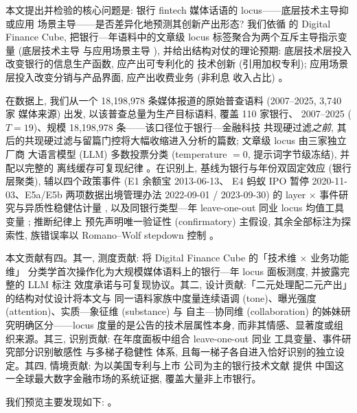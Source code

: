本文提出并检验的核心问题是: 银行 fintech 媒体话语的 locus——底层技术主导抑或应用
场景主导——是否差异化地预测其创新产出形态? 我们依循 \textcite{gomber2017cube} 的
Digital Finance Cube, 把银行—年语料中的文章级 locus 标签聚合为两个互斥主导指示变量
(底层技术主导  与应用场景主导 ),
并给出结构对仗的理论预期: 底层技术层投入改变银行的信息生产函数, 应产出可专利化的
技术创新 (引用加权专利); 应用场景层投入改变分销与产品界面, 应产出收费业务 (非利息
收入占比) \parencite{yoo2010layered,boot2021fintech}。

在数据上, 我们从一个 18{,}198{,}978 条媒体报道的原始普查语料 (2007--2025, 3{,}740 家
媒体来源) 出发, 以该普查总量为生产目标语料, 覆盖 110 家银行、
2007--2025 ($T=19$)、规模 18{,}198{,}978 条——该口径位于银行—金融科技
共现硬过滤\emph{之前}, 其后的共现硬过滤与留篇门控将大幅收缩进入分析的篇数;
文章级 locus 由三家独立厂商
大语言模型 (LLM) 多数投票分类 (temperature $=0$, 提示词字节级冻结), 并配以完整的
离线缓存可复现纪律 \parencite{ludwig2025llmecon,carlson2026llmannotation}。在识别上,
基线为银行与年份双固定效应 (银行层聚类), 辅以四个政策事件 (E1 余额宝 2013-06-13、
E4 蚂蚁 IPO 暂停 2020-11-03、E5a/E5b 两项数据出境管理办法 2022-09-01 / 2023-09-30)
的 layer $\times$ 事件研究与异质性稳健估计量 \parencite{sunabraham2021eventstudy,
borusyak2024revisiting,callaway2021difference}, 以及同银行类型—年 leave-one-out 同业
locus 均值工具变量 \parencite{manski1993reflection,leary2014peereffects}; 推断纪律上
预先声明唯一验证性 (confirmatory) 主假设, 其余全部标注为探索性, 族错误率以
Romano--Wolf stepdown 控制 \parencite{romanowolf2005stepdown}。

本文贡献有四。其一, 测度贡献: 将 Digital Finance Cube 的「技术维 $\times$ 业务功能维」
分类学首次操作化为大规模媒体语料上的银行—年 locus 面板测度, 并披露完整的 LLM 标注
效度承诺与可复现协议。其二, 设计贡献:「二元处理配二元产出」的结构对仗设计将本文与
同一语料家族中度量连续语调 (tone)、曝光强度 (attention)、实质—象征维 (substance) 与
自主—协同维 (collaboration) 的姊妹研究明确区分——locus 度量的是公告的技术层属性本身,
而非其情感、显著度或组织来源。其三, 识别贡献: 在年度面板中组合 leave-one-out 同业
工具变量、事件研究部分识别敏感性 \parencite{rambachan2023honestdid} 与多梯子稳健性
体系, 且每一梯子各自进入恰好识别的独立设定。其四, 情境贡献: 为以美国专利与上市
公司为主的银行技术文献 \parencite{chen2019fintechvalue,lerner2024finpatents} 提供
中国这一全球最大数字金融市场的系统证据, 覆盖大量非上市银行。

我们预览主要发现如下: 。

